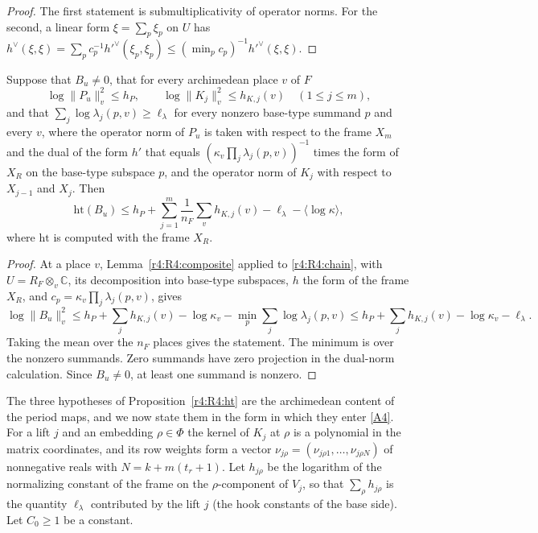 \begin{proof}
The first statement is submultiplicativity of operator norms. For the second, a linear form $\xi=\sum_p\xi_p$ on $U$ has $h^\vee(\xi,\xi)=\sum_pc_p^{-1}h'^\vee(\xi_p,\xi_p)\le(\min_pc_p)^{-1}h'^\vee(\xi,\xi)$.
\end{proof}

\begin{proposition}\label{r4:R4:ht}
Suppose that $B_u\ne0$, that for every archimedean place $v$ of $F$
\[
\log\lVert P_u\rVert_v^2\le h_P,\qquad \log\lVert K_j\rVert_v^2\le h_{K,j}(v)\quad(1\le j\le m),
\]
and that $\sum_j\log\lambda_j(p,v)\ge\ell_\lambda$ for every nonzero base-type summand $p$ and every $v$, where the operator norm of $P_u$ is taken with respect to the frame $X_m$ and the dual of the form $h'$ that equals $(\kappa_v\prod_j\lambda_j(p,v))^{-1}$ times the form of $X_R$ on the base-type subspace $p$, and the operator norm of $K_j$ with respect to $X_{j-1}$ and $X_j$. Then
\[
\mathrm{ht}(B_u)\le h_P+\sum_{j=1}^m\frac1{n_F}\sum_vh_{K,j}(v)-\ell_\lambda-\langle\log\kappa\rangle,
\]
where $\mathrm{ht}$ is computed with the frame $X_R$.
\end{proposition}

\begin{proof}
At a place $v$, Lemma~\ref{r4:R4:composite} applied to \eqref{r4:R4:chain}, with $U=R_F\otimes_v\mathbb C$, its decomposition into base-type subspaces, $h$ the form of the frame $X_R$, and $c_p=\kappa_v\prod_j\lambda_j(p,v)$, gives
\[
\log\lVert B_u\rVert_v^2\le h_P+\sum_jh_{K,j}(v)-\log\kappa_v-\min_p\sum_j\log\lambda_j(p,v)\le h_P+\sum_jh_{K,j}(v)-\log\kappa_v-\ell_\lambda .
\]
Taking the mean over the $n_F$ places gives the statement.
The minimum is over the nonzero summands. Zero summands have zero
projection in the dual-norm calculation. Since $B_u\ne0$, at least
one summand is nonzero.
\end{proof}

The three hypotheses of Proposition~\ref{r4:R4:ht} are the archimedean content of the period maps, and we now state them in the form in which they enter \eqref{A4}. For a lift $j$ and an embedding $\rho\in\Phi$ the kernel of $K_j$ at $\rho$ is a polynomial in the matrix coordinates, and its row weights form a vector $\nu_{j\rho}=(\nu_{j\rho1},\dots,\nu_{j\rho N})$ of nonnegative reals with $N=k+m(t_r+1)$. Let $h_{j\rho}$ be the logarithm of the normalizing constant of the frame on the $\rho$-component of $V_j$, so that $\sum_\rho h_{j\rho}$ is the quantity $\ell_\lambda$ contributed by the lift $j$ (the hook constants of the base side). Let $C_0\ge1$ be a constant.


